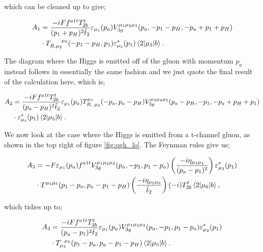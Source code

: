 which can be cleaned up to give;

\begin{equation}
\begin{split}
A_1 &= \frac{-i Ff^{a1t}T^t_{2b}}{(p_1+p_H)^2 \hat{t}_2} \varepsilon_{\mu_1}(p_a)V_{3g}^{\mu_1 \mu_2 \mu_3}(p_a, -p_1-p_H,-p_a+p_1+p_H) \\
&\cdot T_{R, \mu_2}^{\hspace{15pt} \mu_5}(-p_1-p_H, p_1) \varepsilon^*_{\mu_5}(p_1)\mathinner{\langle2\vert\mu_3\vert b\rangle}_{}.
\end{split}
\end{equation}

The diagram where the Higgs is emitted off of the gluon with momentum $p_a$ instead follows in essentially the same fashion and we just quote the final result of the calculation here, which is;

\begin{equation}
\begin{split}
A_2 &=  \frac{-iFf^{a1t}T^t_{2b}}{(p_a-p_H)^2 \hat{t}_2} \varepsilon_{\mu_1}(p_a)T_{R, \hspace{3pt} \mu_3}^{\mu_1}(-p_a,p_a-p_H)V_{3g}^{\mu_3 \mu_4 \mu_5}(p_a-p_H,-p_1,-p_a+p_H+p_1) \\
& \cdot \varepsilon^*_{\mu_4}(p_1)\mathinner{\langle2\vert\mu_5\vert b\rangle}_{}.
\end{split}
\end{equation}

We now look at the case where the Higgs is emitted from a t-channel gluon, as shown in the top right of figure \ref{fig:qgh_lo}. The Feynman rules give us;

\begin{equation}
\begin{split}
A_3 &= -F \varepsilon_{\mu_1}(p_a)f^{a1t}V_{3g}^{\mu_1 \mu_2 \mu_3}(p_a, -p_1, p_1 - p_a) \left(\frac{-i \eta_{\mu_3 \mu_4}}{(p_a-p_1)^2}\right) \varepsilon_{\mu_2}^*(p_1)\\
&\cdot T^{\mu_4 \mu_5}(p_1-p_a,p_a-p_1-p_H)\left(\frac{-i \eta_{\mu_5 \mu_6}}{\hat{t}_2} \right) (-i)T^t_{2b}\mathinner{\langle2\vert\mu_6\vert b\rangle}_{},
\end{split}
\end{equation}

which tidies up to;

\begin{equation}
\begin{split}
A_3 &= \frac{-iF f^{a1t}T^t_{2b}}{(p_a-p_1)^2 \hat{t}_2} \varepsilon_{\mu_1}(p_a)V_{3g}^{\mu_1 \mu_2 \mu_3}(p_a, -p_1, p_1 - p_a)  \varepsilon_{\mu_2}^*(p_1)\\
& \cdot T_{\mu_3}^{\hspace{5pt}\mu_5}(p_1-p_a,p_a-p_1-p_H) \mathinner{\langle2\vert\mu_5\vert b\rangle}_{}.
\end{split}
\end{equation}

